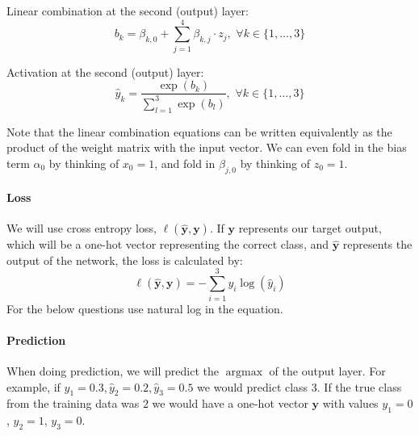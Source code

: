 \documentclass[11pt,addpoints,answers]{exam}
\newcommand{\yv}{\mathbf{y}}
\newcommand \argmax {\operatorname*{argmax}}
\begin{document}
Linear combination at the second (output) layer:
\begin{equation}
\label{eqn:b}
b_k = \beta_{k,0} + \sum_{j=1}^4 \beta_{k,j}\cdot z_j,\,\, \forall k \in \{1,\ldots,3\}
\end{equation}

Activation at the second (output) layer:
\begin{equation}
\label{eqn:yhat}
\hat{y}_k = \frac{\exp(b_k)}{\sum\limits_{l=1}^3 \exp(b_l)},\,\, \forall k \in \{1,\ldots,3\}
\end{equation}

Note that the linear combination equations can be written equivalently as the product of the weight matrix with the input vector. We can even fold in the bias term $\alpha_0$ by thinking of $x_0 = 1$, and fold in $\beta_{j,0}$ by thinking of $z_0 = 1$. \\

\paragraph{Loss}

We will use cross entropy loss, $\ell(\hat{\yv},\yv)$. If $\yv$ represents our target output, which will be a one-hot vector representing the correct class, and $\hat{\yv}$ represents the output of the network, the loss is calculated by:
\begin{equation}
\label{eqn:loss}
  \ell(\hat{\yv},\yv) = - \sum_{i=1}^3 y_i \log(\hat{y}_i)
\end{equation}
For the below questions use natural log in the equation. \\

\paragraph{Prediction}
When doing prediction, we will predict the $\argmax$ of the output layer. For example, if $\hat{y}_1=0.3, \hat{y}_2=0.2, \hat{y}_3=0.5$ we would predict class 3. If the true class from the training data was $2$ we would have a one-hot vector $\yv$ with values $y_1=0$, $y_2=1$, $y_3=0$.
\end{document}
